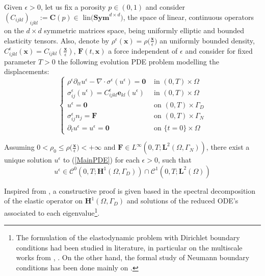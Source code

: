 Given $\epsilon > 0$, let us fix a porosity $p \in (0,1)$ and consider $(C_{ijkl})_{ijkl}:=\mathbf{C}(p) \in \text{ lin}\big(\textbf{Sym}^{d\times d})$, the space of linear, continuous operators on the $d\times d$ symmetric matrices space, being uniformly elliptic and bounded elasticity tensors. Also, denote by $\rho^{\epsilon}(\mathbf{x}) = \rho \big( \frac{\mathbf{x}}{\epsilon}\big)$ an uniformly bounded density, $C_{ijkl}^{\epsilon}(\mathbf{x}) = C_{ijkl}(\frac{\mathbf{x}}{\epsilon})$, $\mathbf{F}(t, \mathbf{x})$ a force independent of $\epsilon$ and consider for fixed parameter $T > 0$ the following evolution PDE problem modelling the displacements:
\begin{equation}
    \label{MainPDE}
    \left \{
    \begin{array}{cc}
        \rho^{\epsilon} \partial_{tt} u^{\epsilon} - \nabla\cdot \sigma^{\epsilon}(u^{\epsilon})= \mathbf{0} & \text{ in } (0,T) \times \Omega \\
        \sigma^{\epsilon}_{ij}(u^{\epsilon}) = C_{ijkl}^{\epsilon} \mathbf{e}_{kl}(u^{\epsilon}) & \text{ in } (0,T)\times \Omega \\
        u^{\epsilon} = \mathbf{0} & \text{ on } (0,T) \times \Gamma_D \\
        \sigma^{\epsilon}_{ij} n_j = \mathbf{F} & \text{ on } (0,T) \times \Gamma_N \\
        \partial_t u^{\epsilon} = u^{\epsilon} = \mathbf{0} & \text{ on } \{t=0\} \times \Omega
    \end{array}
    \right.
\end{equation}
\begin{prop}
Assuming $0 < \rho_0 \leq \rho\big( \frac{\mathbf{x}}{\epsilon} \big) < + \infty$ and $\mathbf{F} \in L^{\infty}(0,T;\mathbf{L}^2(\Omega,\Gamma_N))$, there exist a unique solution $u^{\epsilon}$ to (\ref{MainPDE}) for each $\epsilon > 0$, such that
\begin{equation*}
    u^{\epsilon} \in \mathcal{C}^0(0,T;\mathbf{H}^1(\Omega,\Gamma_D)) \cap \mathcal{C}^1(0,T;\mathbf{L}^2(\Omega))
\end{equation*}
\end{prop}

\begin{rem}
Inspired from \cite{raviart1983introduction}, a constructive proof is given based in the spectral decomposition of the elastic operator on $\mathbf{H}^1(\Omega, \Gamma_D)$ and solutions of the reduced ODE's associated to each eigenvalue\footnote{The formulation of the elastodynamic problem with Dirichlet boundary conditions had been studied in literature, in particular on the multiscale works from \cite{panasenko2005multi-scale}, \cite{bakhvalov1989homogenisation:}. On the other hand, the formal study of Neumann boundary conditions has been done mainly on \cite{oleinik1992mathematical}.}. %
\end{rem}

